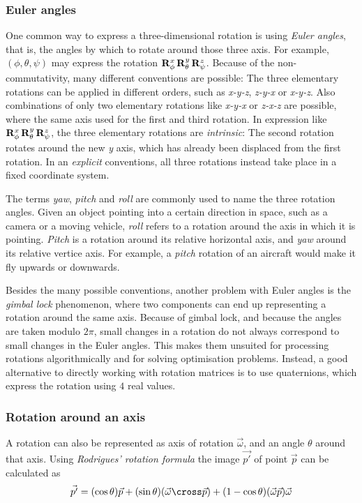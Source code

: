 \subsubsection{Euler angles}
One common way to express a three-dimensional rotation is using \emph{Euler angles}, that is, the angles by which to rotate around those three axis. For example, $(\phi, \theta, \psi)$ may express the rotation $\mathbf{R}_{\phi}^x \, \mathbf{R}_{\theta}^y \, \mathbf{R}_{\psi}^z$. Because of the non-commutativity, many different conventions are possible: The three elementary rotations can be applied in different orders, such as \emph{x-y-z}, \emph{z-y-x} or \emph{x-y-z}. Also combinations of only two elementary rotations like \emph{x-y-x} or \emph{z-x-z} are possible, where the same axis used for the first and third rotation. In expression like $\mathbf{R}_{\phi}^x \, \mathbf{R}_{\theta}^y \, \mathbf{R}_{\psi}^z$, the three elementary rotations are \emph{intrinsic}: The second rotation rotates around the new \emph{y} axis, which has already been displaced from the first rotation. In an \emph{explicit} conventions, all three rotations instead take place in a fixed coordinate system.

The terms \emph{yaw}, \emph{pitch} and \emph{roll} are commonly used to name the three rotation angles. Given an object pointing into a certain direction in space, such as a camera or a moving vehicle, \emph{roll} refers to a rotation around the axis in which it is pointing. \emph{Pitch} is a rotation around its relative horizontal axis, and \emph{yaw} around its relative vertice axis. For example, a \emph{pitch} rotation of an aircraft would make it fly upwards or downwards.

Besides the many possible conventions, another problem with Euler angles is the \emph{gimbal lock} phenomenon, where two components can end up representing a rotation around the same axis. Because of gimbal lock, and because the angles are taken modulo $2\pi$, small changes in a rotation do not always correspond to small changes in the Euler angles. This makes them unsuited for processing rotations algorithmically and for solving optimisation problems. Instead, a good alternative to directly working with rotation matrices is to use quaternions, which express the rotation using $4$ real values.

\subsubsection{Rotation around an axis}
A rotation can also be represented as axis of rotation $\vec{\omega}$, and an angle $\theta$ around that axis. Using \emph{Rodrigues' rotation formula} the image $\vec{p'}$ of point $\vec{p}$ can be calculated as
\begin{equation}
\vec{p'} = (\cos \theta) \vec{p} + (\sin \theta) (\vec{\omega} \cross \vec{p}) + (1 - \cos \theta) (\vec{\omega} \vec{p}) \vec{\omega}
\end{equation}

